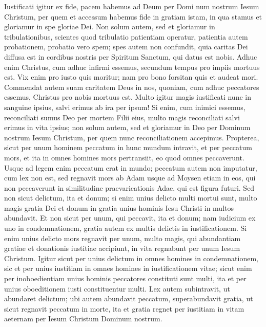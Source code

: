 \begin{biblechapter}  
\verse Iustificati igitur ex fide, pacem habemus ad Deum per Domi num nostrum Iesum Christum, 
\verse per quem et accessum habemus fide in gratiam istam, in qua stamus et gloriamur in spe gloriae Dei. 
\verse Non solum autem, sed et gloriamur in tribulationibus, scientes quod tribulatio patientiam operatur, 
\verse patientia autem probationem, probatio vero spem; 
\verse spes autem non confundit, quia caritas Dei diffusa est in cordibus nostris per Spiritum Sanctum, qui datus est nobis. 
\verse Adhuc enim Christus, cum adhuc infirmi essemus, secundum tempus pro impiis mortuus est. 
\verse Vix enim pro iusto quis moritur; nam pro bono forsitan quis et audeat mori. 
\verse Commendat autem suam caritatem Deus in nos, quoniam, cum adhuc peccatores essemus, Christus pro nobis mortuus est. 
\verse Multo igitur magis iustificati nunc in sanguine ipsius, salvi erimus ab ira per ipsum! 
\verse Si enim, cum inimici essemus, reconciliati sumus Deo per mortem Filii eius, multo magis reconciliati salvi erimus in vita ipsius; 
\verse non solum autem, sed et gloriamur in Deo per Dominum nostrum Iesum Christum, per quem nunc reconciliationem accepimus. 
\verse Propterea, sicut per unum hominem peccatum in hunc mundum intravit, et per peccatum mors, et ita in omnes homines mors pertransiit, eo quod omnes peccaverunt. 
\verse Usque ad legem enim peccatum erat in mundo; peccatum autem non imputatur, cum lex non est, 
\verse sed regnavit mors ab Adam usque ad Moysen etiam in eos, qui non peccaverunt in similitudine praevaricationis Adae, qui est figura futuri. 
\verse Sed non sicut delictum, ita et donum; si enim unius delicto multi mortui sunt, multo magis gratia Dei et donum in gratia unius hominis Iesu Christi in multos abundavit. 
\verse Et non sicut per unum, qui peccavit, ita et donum; nam iudicium ex uno in condemnationem, gratia autem ex multis delictis in iustificationem. 
\verse Si enim unius delicto mors regnavit per unum, multo magis, qui abundantiam gratiae et donationis iustitiae accipiunt, in vita regnabunt per unum Iesum Christum. 
\verse Igitur sicut per unius delictum in omnes homines in condemnationem, sic et per unius iustitiam in omnes homines in iustificationem vitae; 
\verse sicut enim per inoboedientiam unius hominis peccatores constituti sunt multi, ita et per unius oboeditionem iusti constituentur multi. 
\verse Lex autem subintravit, ut abundaret delictum; ubi autem abundavit peccatum, superabundavit gratia, 
\verse ut sicut regnavit peccatum in morte, ita et gratia regnet per iustitiam in vitam aeternam per Iesum Christum Dominum nostrum. 
\end{biblechapter}

